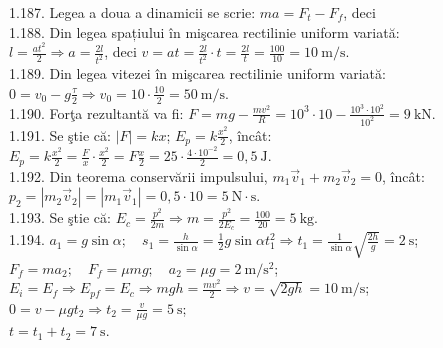 1.187. Legea a doua a dinamicii se scrie: $m a=F_{t}-F_{f}$, deci\\

1.188. Din legea spațiului în mişcarea rectilinie uniform variată:\\ $l=\frac{a t^{2}}{2} \Rightarrow a=\frac{2 l}{t^{2}}$, deci $v=a t=\frac{2 l}{t^{2}} \cdot t=\frac{2 l}{t}=\frac{100}{10}=10 \mathrm{~m} / \mathrm{s}$.\\

1.189. Din legea vitezei în mişcarea rectilinie uniform variată:\\ $0=v_{0}-g \frac{\tau}{2} \Rightarrow v_{0}=10 \cdot \frac{10}{2}=50 \mathrm{~m} / \mathrm{s}$.\\

1.190. Forţa rezultantă va fi: $F=m g-\frac{m v^{2}}{R}=10^{3} \cdot 10-\frac{10^{3} \cdot 10^{2}}{10^{2}}=9 \mathrm{~kN}$.\\

1.191. Se ştie că: $|F|=k x$; $E_{p}=k \frac{x^{2}}{2}$, încât:\\ $E_{p}=k \frac{x^{2}}{2}=\frac{F}{x} \cdot \frac{x^{2}}{2}=F \frac{x}{2}=25 \cdot \frac{4 \cdot 10^{-2}}{2}=0,5 \mathrm{~J}$.\\

1.192. Din teorema conservării impulsului, $m_{1} \vec{v}_{1}+m_{2} \vec{v}_{2}=0$, încât:\\ $p_{2}=\left|m_{2} \vec{v}_{2}\right|=\left|m_{1} \vec{v}_{1}\right|=0,5 \cdot 10=5 \mathrm{~N} \cdot \mathrm{s}$.\\

1.193. Se ştie că: $E_{c}=\frac{p^{2}}{2 m} \Rightarrow m=\frac{p^{2}}{2 E_{c}}=\frac{100}{20}=5 \mathrm{~kg}$.\\

1.194. $a_{1}=g \sin \alpha; \quad s_{1}=\frac{h}{\sin \alpha}=\frac{1}{2} g \sin \alpha t_{1}^{2} \Rightarrow t_{1}=\frac{1}{\sin \alpha} \sqrt{\frac{2 h}{g}}=2 \mathrm{~s}$;\\ $F_{f}=m a_{2}; \quad F_{f}=\mu m g; \quad a_{2}=\mu g=2 \mathrm{~m} / \mathrm{s}^{2}$;\\ $E_{i}=E_{f} \Rightarrow E_{p f}=E_{c} \Rightarrow m g h=\frac{m v^{2}}{2} \Rightarrow v=\sqrt{2 g h}=10 \mathrm{~m} / \mathrm{s}$;\\ $0=v-\mu g t_{2} \Rightarrow t_{2}=\frac{v}{\mu g}=5 \mathrm{~s}$;\\ $t=t_{1}+t_{2}=7 \mathrm{~s}$.\\

